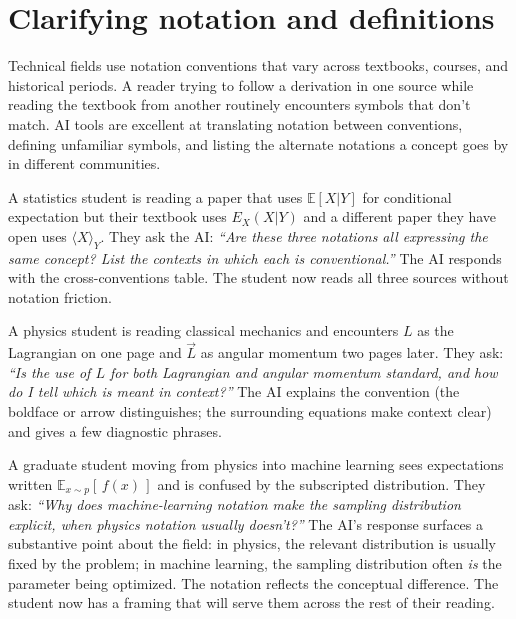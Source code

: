 \documentclass[11pt]{book}
\begin{document}
\section{Clarifying notation and definitions}

Technical fields use notation conventions that vary across textbooks, courses, and historical periods. A reader trying to follow a derivation in one source while reading the textbook from another routinely encounters symbols that don't match. AI tools are excellent at translating notation between conventions, defining unfamiliar symbols, and listing the alternate notations a concept goes by in different communities.

\begin{example}
A statistics student is reading a paper that uses $\mathbb{E}[X | Y]$ for conditional expectation but their textbook uses $E_X(X|Y)$ and a different paper they have open uses $\langle X \rangle_Y$. They ask the AI: \emph{``Are these three notations all expressing the same concept? List the contexts in which each is conventional.''} The AI responds with the cross-conventions table. The student now reads all three sources without notation friction.
\end{example}

\begin{example}
A physics student is reading classical mechanics and encounters $L$ as the Lagrangian on one page and $\vec{L}$ as angular momentum two pages later. They ask: \emph{``Is the use of $L$ for both Lagrangian and angular momentum standard, and how do I tell which is meant in context?''} The AI explains the convention (the boldface or arrow distinguishes; the surrounding equations make context clear) and gives a few diagnostic phrases.
\end{example}

\begin{example}
A graduate student moving from physics into machine learning sees expectations written $\mathbb{E}_{x \sim p}[\,f(x)\,]$ and is confused by the subscripted distribution. They ask: \emph{``Why does machine-learning notation make the sampling distribution explicit, when physics notation usually doesn't?''} The AI's response surfaces a substantive point about the field: in physics, the relevant distribution is usually fixed by the problem; in machine learning, the sampling distribution often \emph{is} the parameter being optimized. The notation reflects the conceptual difference. The student now has a framing that will serve them across the rest of their reading.
\end{example}
\end{document}
